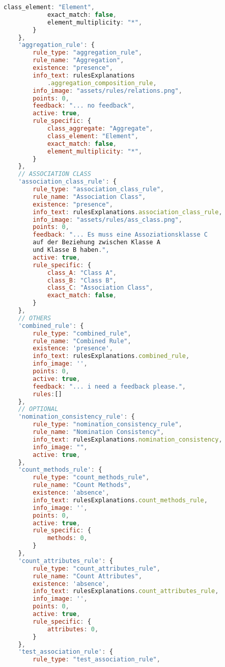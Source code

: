 \begin{lstlisting}[caption={Rules Definition JSON}, label={lst:rules_def}, language=javascript]
            class_element: "Element",
            exact_match: false,
            element_multiplicity: "*",
        }
    },
    'aggregation_rule': {
        rule_type: "aggregation_rule",
        rule_name: "Aggregation",
        existence: "presence",
        info_text: rulesExplanations
            .aggregation_composition_rule,
        info_image: "assets/rules/relations.png",
        points: 0,
        feedback: "... no feedback",
        active: true,
        rule_specific: {
            class_aggregate: "Aggregate",
            class_element: "Element",
            exact_match: false,
            element_multiplicity: "*",
        }
    },
    // ASSOCIATION CLASS
    'association_class_rule': {
        rule_type: "association_class_rule",
        rule_name: "Association Class",
        existence: "presence",
        info_text: rulesExplanations.association_class_rule,
        info_image: "assets/rules/ass_class.png",
        points: 0,
        feedback: "... Es muss eine Assoziationsklasse C
        auf der Beziehung zwischen Klasse A
        und Klasse B haben.",
        active: true,
        rule_specific: {
            class_A: "Class A",
            class_B: "Class B",
            class_C: "Association Class",
            exact_match: false,
        }
    },
    // OTHERS
    'combined_rule': {
        rule_type: "combined_rule",
        rule_name: "Combined Rule",
        existence: 'presence',
        info_text: rulesExplanations.combined_rule,
        info_image: '',
        points: 0,
        active: true,
        feedback: "... i need a feedback please.",
        rules:[]
    },
    // OPTIONAL
    'nomination_consistency_rule': {
        rule_type: "nomination_consistency_rule",
        rule_name: "Nomination Consistency",
        info_text: rulesExplanations.nomination_consistency,
        info_image: "",
        active: true,
    },
    'count_methods_rule': {
        rule_type: "count_methods_rule",
        rule_name: "Count Methods",
        existence: 'absence',
        info_text: rulesExplanations.count_methods_rule,
        info_image: '',
        points: 0,
        active: true,
        rule_specific: {
            methods: 0,
        }
    },
    'count_attributes_rule': {
        rule_type: "count_attributes_rule",
        rule_name: "Count Attributes",
        existence: 'absence',
        info_text: rulesExplanations.count_attributes_rule,
        info_image: '',
        points: 0,
        active: true,
        rule_specific: {
            attributes: 0,
        }
    },
    'test_association_rule': {
        rule_type: "test_association_rule",

\end{lstlisting}
